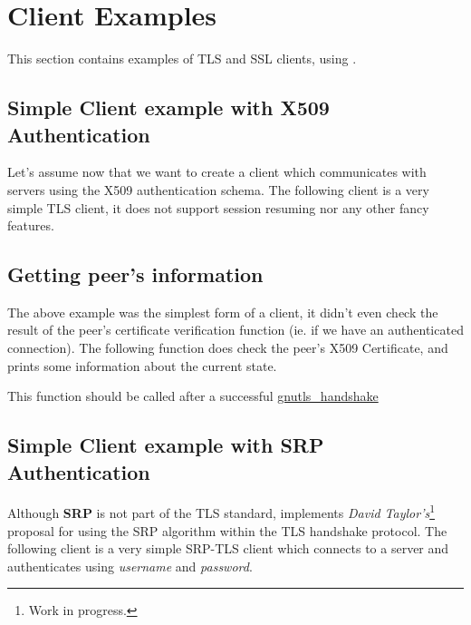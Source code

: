 \documentclass{book}
\begin{document}












\section{Client Examples}
This section contains examples of TLS and SSL clients, using \gnutls. 

\subsection{Simple Client example with X509 Authentication}
Let's assume now that we want to create a client which communicates
with servers using the X509 authentication schema. The following client
is a very simple TLS client, it does not support session resuming nor
any other fancy features.


\subsection{Getting peer's information}
\par The above example was the simplest form of a client, it didn't even check
the result of the peer's certificate verification function (ie. if we have
an authenticated connection). The following function does check the peer's X509
Certificate, and prints some information about the current state.
\par
This function should be called after a successful
\hyperref{gnutls\_handshake()}{gnutls\_handshake() (see Section }{ for more information)}{gnutls_handshake}





\subsection{Simple Client example with SRP Authentication}
Although {\bf SRP} is not part of the TLS standard, \gnutls implements
{\it David Taylor's}\footnote{Work in progress.} proposal for using the SRP algorithm
within the TLS handshake protocol. The following client
is a very simple SRP-TLS client which connects to a server 
and authenticates using {\it username} and {\it password}.
\end{document}
